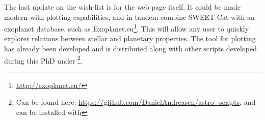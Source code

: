The last update on the wish-list is for the web page itself. It could be made modern with plotting
capabilities, and in tandem combine SWEET-Cat with an exoplanet database, such as
Exoplanet.eu\footnote{\url{http://exoplanet.eu/}}. This will allow any user to quickly explorer
relations between stellar and planetary properties. The tool for plotting has already been developed
and is distributed along with other scripts developed during this PhD under
\footnote{Can be found here:
\url{https://github.com/DanielAndreasen/astro_scripts}, and can be installed with }.
